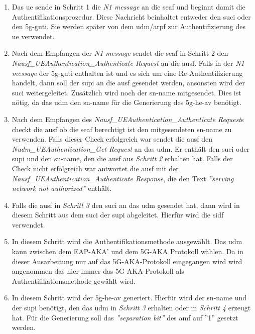 \begin{enumerate}
\item Das \gls{ue} sende in Schritt 1 die \textit{N1 message} an die \gls{seaf} und beginnt damit die Authentifikationsprozedur.
Diese Nachricht beinhaltet entweder den \gls{suci} oder den \gls{5g-guti}.
Sie werden sp\"ater von dem \gls{udm}/\gls{arpf} zur Authentifizierung des \gls{ue} verwendet.

\item Nach dem Empfangen der \textit{N1 message} sendet die \gls{seaf} in Schritt 2 den \textit{Nausf\_UEAuthentication\_Authenticate Request} an die \gls{ausf}.
Falls in der \textit{N1 message} der \gls{5g-guti} enthalten ist und es sich um eine Re-Authentifizierung handelt, dann soll der \gls{supi} an die \gls{ausf} gesendet werden, ansonsten wird der \gls{suci} weitergeleitet.
Zus\"atzlich wird noch der \gls{sn-name} mitgesendet.
Dies ist n\"otig, da das \gls{udm} den \gls{sn-name} f\"ur die Generierung des \gls{5g-he-av} ben\"otigt.

\item Nach dem Empfangen des \textit{Nausf\_UEAuthentication\_Authenticate Request}s checkt die \gls{ausf} ob die \gls{seaf} berechtigt ist den mitgesendeten \gls{sn-name} zu verwenden.
Falls dieser Check erfolgreich war sendet die \gls{ausf} den \textit{Nudm\_UEAuthentication\_Get Request} an das \gls{udm}.
Er enth\"alt den \gls{suci} oder \gls{supi} und den \gls{sn-name}, den die \gls{ausf} aus \textit{Schritt 2} erhalten hat.
Falls der Check nicht erfolgreich war antwortet die \gls{ausf} mit der \textit{Nausf\_UEAuthentication\_Authenticate Response}, die den Text \textit{''serving network not authorized''} enth\"alt.

\item Falls die \gls{ausf} in \textit{Schritt 3} den \gls{suci} an das \gls{udm} gesendet hat, dann wird in diesem Schritt aus dem \gls{suci} der \gls{supi} abgeleitet.
Hierf\"ur wird die \gls{sidf} verwendet.

\item In diesem Schritt wird die Authentifikationsmethode ausgew\"ahlt.
Das \gls{udm} kann zwischen dem EAP-AKA' und dem 5G-AKA Protokoll w\"ahlen.
Da in dieser Ausarbeitung nur auf das 5G-AKA-Protokoll eingegangen wird wird angenommen das hier immer das 5G-AKA-Protokoll als Authentifikationsmethode gew\"ahlt wird.

\item In diesem Schritt wird der \gls{5g-he-av} generiert.
Hierf\"ur wird der \gls{sn-name} und der \gls{supi} ben\"otigt, den das \gls{udm} in \textit{Schritt 3} erhalten oder in \textit{Schritt 4} erzeugt hat.
F\"ur die Generierung soll das \textit{''separation bit''} des \gls{amf} auf ''1'' gesetzt werden.


\end{enumerate}
